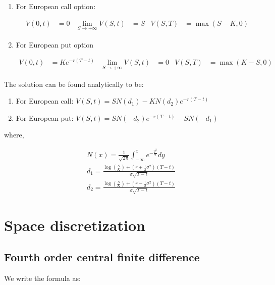 \documentclass[12pt]{article}
\begin{document}
\begin{enumerate}
    \item For European call option:
    
    \begin{align*}
    V(0, t)&=0 & \lim _{S \rightarrow+\infty} V(S, t)&=S & V(S, T)&=\max (S-K, 0)
    \end{align*}

    

\item For European put option

    \begin{align*}
        V(0, t)&=K e^{-r(T-t)} & \lim _{S \rightarrow+\infty} V(S, t)&=0 & V(S, T)&=\max (K-S, 0)
    \end{align*}

\end{enumerate}

The solution can be found analytically to be:

\begin{enumerate}
    \item For European call: $V(S, t)=S N\left(d_{1}\right)-K N\left(d_{2}\right) e^{-r(T-t)}$
    
    \item For European put: $V(S, t)=S N\left(-d_{2}\right) e^{-r(T-t)}-S N\left(-d_{1}\right)$
\end{enumerate}


where,

$$
\begin{gathered}
N(x)=\frac{1}{\sqrt{2 \pi}} \int_{-\infty}^{x} e^{-\frac{y^{2}}{2}} d y \\
d_{1}=\frac{\log \left(\frac{S}{K}\right)+\left(r+\frac{1}{2} \sigma^{2}\right)(T-t)}{\sigma \sqrt{T-t}} \\
d_{2}=\frac{\log \left(\frac{S}{K}\right)+\left(r-\frac{1}{2} \sigma^{2}\right)(T-t)}{\sigma \sqrt{T-t}}
\end{gathered}
$$



\section{Space discretization}

\subsection{Fourth order central finite difference}

We write the formula as:
\end{document}
